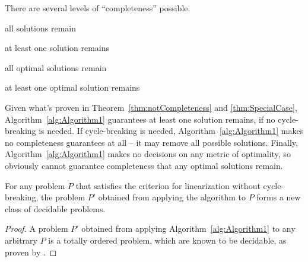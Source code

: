 There are several levels of \enquote{completeness} possible. 
\begin{compactitem}
	\item all solutions remain 
	\item at least one solution remains 
	\item all optimal solutions remain
	\item at least one optimal solution remains 	
\end{compactitem}
Given what's proven in Theorem~\ref{thm:notCompleteness} and \ref{thm:SpecialCase}, Algorithm~\ref{alg:Algorithm1} guarantees at least one solution remains, if no cycle-breaking is needed. If cycle-breaking is needed, Algorithm~\ref{alg:Algorithm1} makes no completeness guarantees at all -- it may remove all possible solutions. Finally, Algorithm~\ref{alg:Algorithm1} makes no decisions on any metric of optimality, so obviously cannot guarantee completeness that any optimal solutions remain.



\begin{theorem}\label{thm:newClass}
	For any problem $P$ that satisfies the criterion for linearization without cycle-breaking, the problem $P'$ obtained from applying the algorithm to $P$ forms a new class of decidable problems.
\end{theorem}
\begin{proof}
	A problem $P'$ obtained from applying Algorithm~\ref{alg:Algorithm1} to any arbitrary $P$ is a totally ordered problem, which are known to be decidable, as proven by \cite{Alford2015TightHTNBounds}.  
\end{proof}



